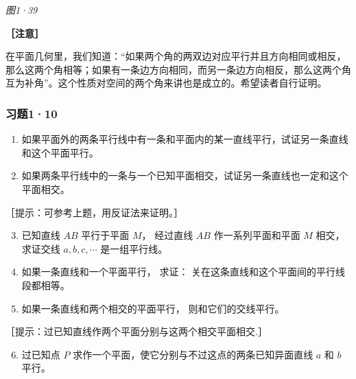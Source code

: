 \emph{图1·39}

\textbf{［注意］}

在平面几何里，我们知道：``如果两个角的两双边对应平行并且方向相同或相反，那么这两个角相等；如果有一条边方向相同，而另一条边方向相反，那么这两个角互为补角''。这个性质对空间的两个角来讲也是成立的。希望读者自行证明。

\subsubsection{习题1·10}

\begin{enumerate}
\item
  如果平面外的两条平行线中有一条和平面内的某一直线平行，试证另一条直线和这个平面平行。
\item
  如果两条平行线中的一条与一个已知平面相交，试证另一条直线也一定和这个平面相交。
\end{enumerate}

［提示：可参考上题，用反证法来证明。］

\begin{enumerate}
\setcounter{enumi}{2}
\item
  已知直线 \(AB\) 平行于平面 \(M\)， 经过直线 \(AB\) 作一系列平面和平面
  \(M\) 相交， 求证交线 \(a, b, c, \cdots\) 是一组平行线。
\item
  如果一条直线和一个平面平行， 求证：
  关在这条直线和这个平面间的平行线段都相等。
\item
  如果一条直线和两个相交的平面平行， 则和它们的交线平行。
\end{enumerate}

［提示：过已知直线作两个平面分别与这两个相交平面相交.］

\begin{enumerate}
\setcounter{enumi}{5}
\item
  过已知点 \(P\) 求作一个平面，使它分别与不过这点的两条已知异面直线
  \(a\) 和 \(b\) 平行。
\end{enumerate}

